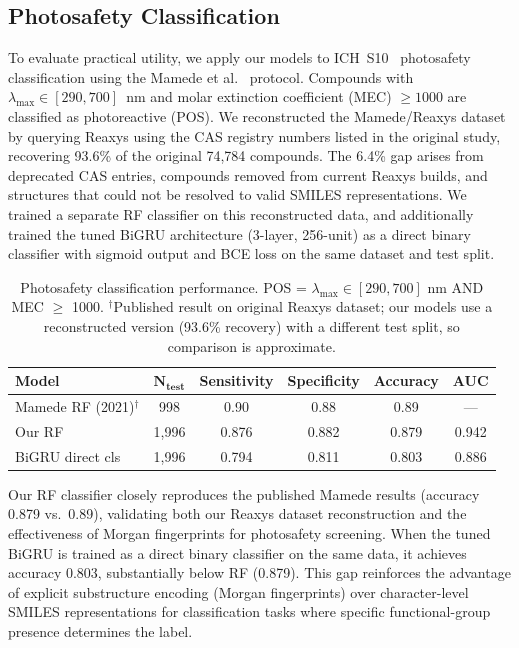 \documentclass[11pt,a4paper]{article}
\begin{document}
\subsection{Photosafety Classification}
\label{sec:classification}

To evaluate practical utility, we apply our models to ICH~S10~\cite{ICH2013S10} photosafety classification using the Mamede et al.~\cite{mamede2021machine} protocol.
Compounds with $\lambda_{\max} \in [290, 700]$~nm and molar extinction coefficient (MEC) $\geq 1000$ are classified as photoreactive (POS).
We reconstructed the Mamede/Reaxys dataset by querying Reaxys using the CAS registry numbers listed in the original study, recovering 93.6\% of the original 74,784 compounds.
The 6.4\% gap arises from deprecated CAS entries, compounds removed from current Reaxys builds, and structures that could not be resolved to valid SMILES representations.
We trained a separate RF classifier on this reconstructed data, and additionally trained the tuned BiGRU architecture (3-layer, 256-unit) as a direct binary classifier with sigmoid output and BCE loss on the same dataset and test split.

\begin{table}[t]
\centering
\caption{Photosafety classification performance. POS = $\lambda_{\max} \in [290,700]$ nm AND MEC $\geq$ 1000. $^\dagger$Published result on original Reaxys dataset; our models use a reconstructed version (93.6\% recovery) with a different test split, so comparison is approximate.}
\label{tab:classification}
\begin{tabular}{lccccc}
\toprule
\textbf{Model} & $\boldsymbol{N_{\text{test}}}$ & \textbf{Sensitivity} & \textbf{Specificity} & \textbf{Accuracy} & \textbf{AUC} \\
\midrule
Mamede RF (2021)$^\dagger$  & 998   & 0.90  & 0.88  & 0.89  & ---   \\
Our RF                      & 1,996 & 0.876 & 0.882 & 0.879 & 0.942 \\
BiGRU direct cls            & 1,996 & 0.794 & 0.811 & 0.803 & 0.886 \\
\bottomrule
\end{tabular}
\end{table}

Our RF classifier closely reproduces the published Mamede results (accuracy 0.879 vs.\ 0.89), validating both our Reaxys dataset reconstruction and the effectiveness of Morgan fingerprints for photosafety screening.
When the tuned BiGRU is trained as a direct binary classifier on the same data, it achieves accuracy 0.803, substantially below RF (0.879).
This gap reinforces the advantage of explicit substructure encoding (Morgan fingerprints) over character-level SMILES representations for classification tasks where specific functional-group presence determines the label.
\end{document}
